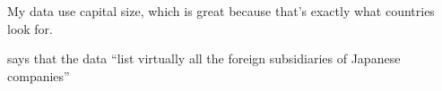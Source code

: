 My data use capital size, which is great because that's exactly what countries look for. 


\citep[295]{Yamawaki1991} says that the data ``list virtually all the foreign subsidiaries of Japanese companies''